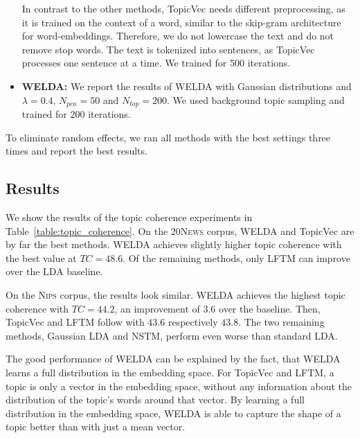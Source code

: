 \documentclass[
        a4paper,
        titlepage,
        twoside,
        parskip,
        numbers=noenddot
        ]{scrbook}
\theoremstyle{break}
\begin{document}
\begin{itemize}
    In contrast to the other methods, TopicVec needs different preprocessing, as it is trained on the context of a word, similar to the skip-gram architecture for word-embeddings.
    Therefore, we do not lowercase the text and do not remove stop words.
    The text is tokenized into sentences, as TopicVec processes one sentence at a time.
    We trained for 500 iterations.
  \item
    \textbf{WELDA:}
    We report the results of WELDA with Gaussian distributions and $\lambda = 0.4$, $N_{pca} = 50$ and $N_{top} = 200$.
    We used background topic sampling and trained for $200$ iterations.
\end{itemize}

To eliminate random effects, we ran all methods with the best settings three times and report the best results.

\subsection{Results}
We show the results of the topic coherence experiments in Table~\ref{table:topic_coherence}.
On the \textsc{20News} corpus, WELDA and TopicVec are by far the best methods.
WELDA achieves slightly higher topic coherence with the best value at $TC = 48.6$.
Of the remaining methods, only LFTM can improve over the LDA baseline.

On the \textsc{Nips} corpus, the results look similar.
WELDA achieves the highest topic coherence with $TC = 44.2$, an improvement of $3.6$ over the baseline.
Then, TopicVec and LFTM follow with $43.6$ respectively $43.8$.
The two remaining methods, Gaussian LDA and NSTM, perform even worse than standard LDA.

The good performance of WELDA can be explained by the fact, that WELDA learns a full distribution in the embedding space.
For TopicVec and LFTM, a topic is only a vector in the embedding space, without any information about the distribution of the topic's words around that vector.
By learning a full distribution in the embedding space, WELDA is able to capture the shape of a topic better than with just a mean vector.
\end{document}

